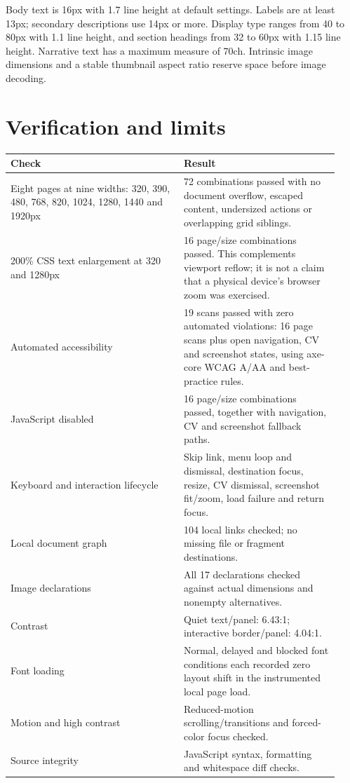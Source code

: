 \documentclass[11pt,a4paper]{article}
\begin{document}
Body text is 16px with 1.7 line height at default settings. Labels are at least 13px; secondary descriptions use 14px or more. Display type ranges from 40 to 80px with 1.1 line height, and section headings from 32 to 60px with 1.15 line height. Narrative text has a maximum measure of 70ch. Intrinsic image dimensions and a stable thumbnail aspect ratio reserve space before image decoding.

\section{Verification and limits}
\begin{longtable}{p{0.49\linewidth}p{0.44\linewidth}}
\toprule
Check & Result \\
\midrule
\endhead
Eight pages at nine widths: 320, 390, 480, 768, 820, 1024, 1280, 1440 and 1920px & 72 combinations passed with no document overflow, escaped content, undersized actions or overlapping grid siblings. \\
200\% CSS text enlargement at 320 and 1280px & 16 page/size combinations passed. This complements viewport reflow; it is not a claim that a physical device's browser zoom was exercised. \\
Automated accessibility & 19 scans passed with zero automated violations: 16 page scans plus open navigation, CV and screenshot states, using axe-core WCAG A/AA and best-practice rules. \\
JavaScript disabled & 16 page/size combinations passed, together with navigation, CV and screenshot fallback paths. \\
Keyboard and interaction lifecycle & Skip link, menu loop and dismissal, destination focus, resize, CV dismissal, screenshot fit/zoom, load failure and return focus. \\
Local document graph & 104 local links checked; no missing file or fragment destinations. \\
Image declarations & All 17 declarations checked against actual dimensions and nonempty alternatives. \\
Contrast & Quiet text/panel: 6.43:1; interactive border/panel: 4.04:1. \\
Font loading & Normal, delayed and blocked font conditions each recorded zero layout shift in the instrumented local page load. \\
Motion and high contrast & Reduced-motion scrolling/transitions and forced-color focus checked. \\
Source integrity & JavaScript syntax, formatting and whitespace diff checks. \\
\bottomrule
\end{longtable}
\end{document}
